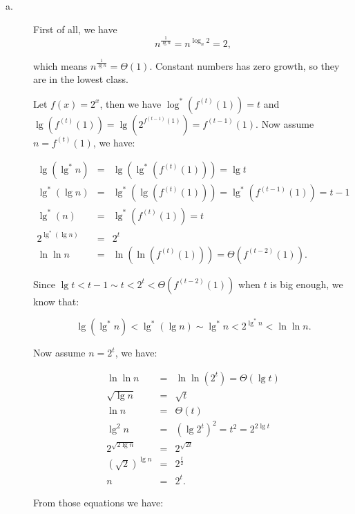 \answer

\begin{description}

\item[a. \hspace{9pt}] First of all, we have 
$$n^{\frac{1}{\lg n}} = n^{\log_n{2}} = 2,$$

which means $n^{\frac{1}{\lg n}} = \Theta(1).$ Constant numbers has zero growth, so they are in the lowest class.

Let $f(x) = 2^x$, then we have $\log^*{\left(f^{(t)}(1)\right)} = t$ and $\lg\left(f^{(t)}(1)\right) = \lg\left(2^{f^{(t-1)}(1)}\right) = f^{(t-1)}(1)$. Now assume $n = f^{(t)}(1)$, we have:

\begin{eqnarray*}
\lg\left(\lg^*n\right) &=& \lg\left(\lg^*\left(f^{(t)}(1)\right)\right) = \lg t\\
\lg^*\left(\lg n\right) &=& \lg^*\left(\lg \left(f^{(t)}(1)\right)\right) = \lg^*\left(f^{(t-1)}(1)\right) = t-1\\
\lg^*(n) &=& \lg^*\left(f^{(t)}(1)\right) = t\\
2^{\lg^*\left(\lg n\right)} &=& 2^t\\
\ln\ln n &=& \ln \left(\ln \left(f^{(t)}(1)\right)\right) = \Theta\left(f^{(t - 2)}(1)\right).
\end{eqnarray*}

Since $\lg t < t - 1 \sim t < 2^t <\Theta\left(f^{(t - 2)}(1)\right)$ when $t$ is big enough, we know that:

\begin{equation}
\lg\left(\lg^*n\right) < \lg^*\left(\lg n\right) \sim \lg^*n < 2^{\lg^*n} < \ln \ln n.
\end{equation}

Now assume $n = 2^t$, we have:

\begin{eqnarray*}
\ln\ln n &=& \ln \ln \left(2^t\right) = \Theta\left(\lg t\right)\\
\sqrt{\lg n} &=& \sqrt{t}\\
\ln n &=& \Theta(t)\\
\lg^2{n} &=& \left(\lg2^t\right)^2 =  t^2 = 2^{2\lg t}\\
2^{\sqrt{2\lg n}} &=& 2^{\sqrt{2t}}\\
\left(\sqrt{2}\right)^{\lg n} &=& 2^{\frac{t}{2}}\\
n &=& 2^t.
\end{eqnarray*}

From those equations we have:


\end{description}
